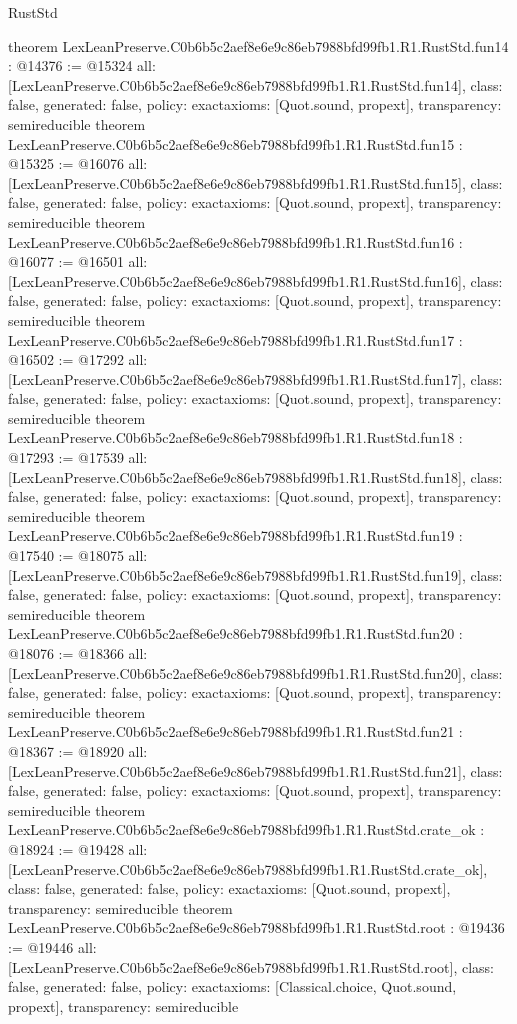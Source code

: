 \begin{lexlean}{RustStd}
\begin{coremodule}
{}
theorem LexLeanPreserve.C0b6b5c2aef8e6e9c86eb7988bfd99fb1.R1.RustStd.fun14 : @14376 := @15324 {
  all: [LexLeanPreserve.C0b6b5c2aef8e6e9c86eb7988bfd99fb1.R1.RustStd.fun14],
  class: false,
  generated: false,
  policy: exact{axioms: [Quot.sound, propext]},
  transparency: semireducible
}
theorem LexLeanPreserve.C0b6b5c2aef8e6e9c86eb7988bfd99fb1.R1.RustStd.fun15 : @15325 := @16076 {
  all: [LexLeanPreserve.C0b6b5c2aef8e6e9c86eb7988bfd99fb1.R1.RustStd.fun15],
  class: false,
  generated: false,
  policy: exact{axioms: [Quot.sound, propext]},
  transparency: semireducible
}
theorem LexLeanPreserve.C0b6b5c2aef8e6e9c86eb7988bfd99fb1.R1.RustStd.fun16 : @16077 := @16501 {
  all: [LexLeanPreserve.C0b6b5c2aef8e6e9c86eb7988bfd99fb1.R1.RustStd.fun16],
  class: false,
  generated: false,
  policy: exact{axioms: [Quot.sound, propext]},
  transparency: semireducible
}
theorem LexLeanPreserve.C0b6b5c2aef8e6e9c86eb7988bfd99fb1.R1.RustStd.fun17 : @16502 := @17292 {
  all: [LexLeanPreserve.C0b6b5c2aef8e6e9c86eb7988bfd99fb1.R1.RustStd.fun17],
  class: false,
  generated: false,
  policy: exact{axioms: [Quot.sound, propext]},
  transparency: semireducible
}
theorem LexLeanPreserve.C0b6b5c2aef8e6e9c86eb7988bfd99fb1.R1.RustStd.fun18 : @17293 := @17539 {
  all: [LexLeanPreserve.C0b6b5c2aef8e6e9c86eb7988bfd99fb1.R1.RustStd.fun18],
  class: false,
  generated: false,
  policy: exact{axioms: [Quot.sound, propext]},
  transparency: semireducible
}
theorem LexLeanPreserve.C0b6b5c2aef8e6e9c86eb7988bfd99fb1.R1.RustStd.fun19 : @17540 := @18075 {
  all: [LexLeanPreserve.C0b6b5c2aef8e6e9c86eb7988bfd99fb1.R1.RustStd.fun19],
  class: false,
  generated: false,
  policy: exact{axioms: [Quot.sound, propext]},
  transparency: semireducible
}
theorem LexLeanPreserve.C0b6b5c2aef8e6e9c86eb7988bfd99fb1.R1.RustStd.fun20 : @18076 := @18366 {
  all: [LexLeanPreserve.C0b6b5c2aef8e6e9c86eb7988bfd99fb1.R1.RustStd.fun20],
  class: false,
  generated: false,
  policy: exact{axioms: [Quot.sound, propext]},
  transparency: semireducible
}
theorem LexLeanPreserve.C0b6b5c2aef8e6e9c86eb7988bfd99fb1.R1.RustStd.fun21 : @18367 := @18920 {
  all: [LexLeanPreserve.C0b6b5c2aef8e6e9c86eb7988bfd99fb1.R1.RustStd.fun21],
  class: false,
  generated: false,
  policy: exact{axioms: [Quot.sound, propext]},
  transparency: semireducible
}
theorem LexLeanPreserve.C0b6b5c2aef8e6e9c86eb7988bfd99fb1.R1.RustStd.crate_ok : @18924 := @19428 {
  all: [LexLeanPreserve.C0b6b5c2aef8e6e9c86eb7988bfd99fb1.R1.RustStd.crate_ok],
  class: false,
  generated: false,
  policy: exact{axioms: [Quot.sound, propext]},
  transparency: semireducible
}
theorem LexLeanPreserve.C0b6b5c2aef8e6e9c86eb7988bfd99fb1.R1.RustStd.root : @19436 := @19446 {
  all: [LexLeanPreserve.C0b6b5c2aef8e6e9c86eb7988bfd99fb1.R1.RustStd.root],
  class: false,
  generated: false,
  policy: exact{axioms: [Classical.choice, Quot.sound, propext]},
  transparency: semireducible
}


\end{coremodule}
\end{lexlean}

